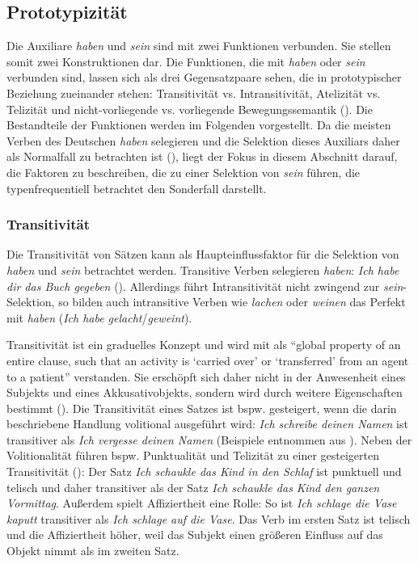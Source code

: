 \subsection{Prototypizität} 
\label{selproto}

Die Auxiliare \textit{haben} und \textit{sein} sind mit zwei Funktionen verbunden. Sie stellen somit zwei Konstruktionen dar. Die Funktionen, die mit \textit{haben} oder \textit{sein} verbunden sind, lassen sich als drei Gegensatzpaare sehen, die in prototypischer Beziehung zueinander stehen: Transitivität vs. Intransitivität, Atelizität vs. Telizität und nicht-vorliegende vs. vorliegende Bewegungssemantik (\cite{Shannon.1992, Shannon.1995}). Die Bestandteile der Funktionen werden im Folgenden vorgestellt. Da die meisten Verben des Deutschen \textit{haben} selegieren und die Selektion dieses Auxiliars daher als Normalfall zu betrachten ist (\cite[§ 659]{Duden.2016}), liegt der Fokus in diesem Abschnitt darauf, die Faktoren zu beschreiben, die zu einer Selektion von \textit{sein} führen, die typenfrequentiell betrachtet den Sonderfall darstellt. 



\subsubsection{Transitivität} 
\label{trans}

Die Transitivität von Sätzen kann als Haupteinflussfaktor für die Selektion von \textit{haben} und \textit{sein} betrachtet werden. Transitive Verben selegieren \textit{haben}: \textit{Ich habe dir das Buch gegeben} (\cite[87--95]{Gillmann.2016}). Allerdings führt Intransitivität nicht zwingend zur \textit{sein}-Selektion, so bilden auch intransitive Verben wie \textit{lachen} oder \textit{weinen} das Perfekt mit \textit{haben} (\textit{Ich habe gelacht}/\textit{geweint}). 



Transitivität ist ein graduelles Konzept und wird mit \textcite[251]{Hopper.1980} als "`global property of an entire clause, such that an activity is `carried over' or `transferred' from an agent to a patient"' verstanden. Sie erschöpft sich daher nicht in der Anwesenheit eines Subjekts und eines Akkusativobjekts, sondern wird durch weitere Eigenschaften bestimmt (\cite[46]{Gillmann.2016}). Die Transitivität eines Satzes ist bspw. gesteigert, wenn die darin beschriebene Handlung volitional ausgeführt wird: \textit{Ich schreibe deinen Namen} ist transitiver als \textit{Ich vergesse deinen Namen} (Beispiele entnommen aus \cite[47]{Gillmann.2016}). Neben der Volitionalität führen bspw. Punktualität und Telizität zu einer gesteigerten Transitivität (\cite[46--47]{Gillmann.2016}): Der Satz \textit{Ich schaukle das Kind in den Schlaf} ist punktuell und telisch und daher transitiver als der Satz \textit{Ich schaukle das Kind den ganzen Vormittag}. Außerdem spielt Affiziertheit eine Rolle: So ist \textit{Ich schlage die Vase kaputt} transitiver als \textit{Ich schlage auf die Vase}. Das Verb im ersten Satz ist telisch und die Affiziertheit höher, weil das Subjekt einen größeren Einfluss auf das Objekt nimmt als im zweiten Satz. 



